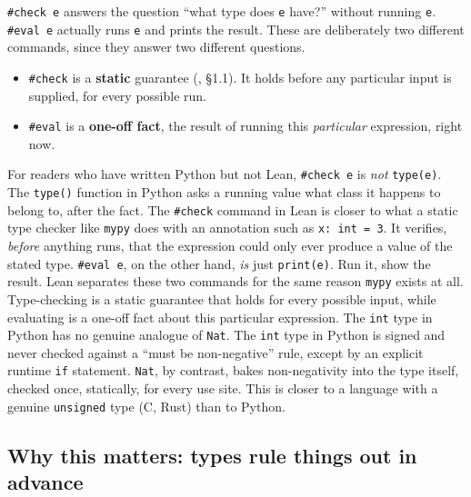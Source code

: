 \texttt{\#check e} answers the question ``what type does \texttt{e} have?'' without running \texttt{e}. \texttt{\#eval e} actually runs \texttt{e} and prints the result. These are deliberately two different commands, since they answer two different questions.

\begin{itemize}
\tightlist
\item
  \texttt{\#check} is a \textbf{static} guarantee (\cite{Pierce2002}, §1.1). It holds before any particular input is supplied, for every possible run.
\item
  \texttt{\#eval} is a \textbf{one-off fact}, the result of running this \emph{particular} expression, right now.
\end{itemize}

\begin{progcorner}

For readers who have written Python but not Lean, \texttt{\#check e} is \emph{not} \texttt{type(e)}. The \texttt{type()} function in Python asks a running value what class it happens to belong to, after the fact. The \texttt{\#check} command in Lean is closer to what a static type checker like \texttt{mypy} does with an annotation such as \texttt{x: int = 3}. It verifies, \emph{before} anything runs, that the expression could only ever produce a value of the stated type. \texttt{\#eval e}, on the other hand, \emph{is} just \texttt{print(e)}. Run it, show the result. Lean separates these two commands for the same reason \texttt{mypy} exists at all. Type-checking is a static guarantee that holds for every possible input, while evaluating is a one-off fact about this particular expression. The \texttt{int} type in Python has no genuine analogue of \texttt{Nat}. The \texttt{int} type in Python is signed and never checked against a ``must be non-negative'' rule, except by an explicit runtime \texttt{if} statement. \texttt{Nat}, by contrast, bakes non-negativity into the type itself, checked once, statically, for every use site. This is closer to a language with a genuine \texttt{unsigned} type (C, Rust) than to Python.

\end{progcorner}

\subsection{Why this matters: types rule things out in advance}\label{sec:01-basics:01-everything-has-a-type:2}

